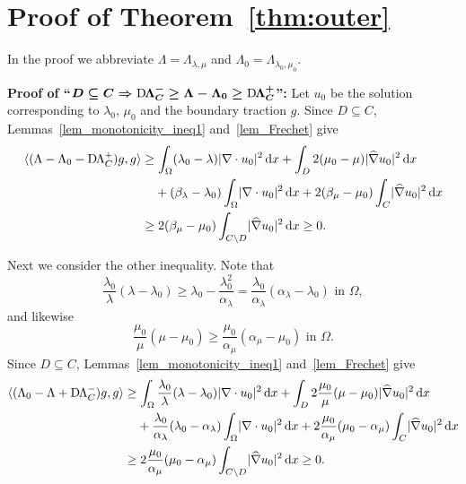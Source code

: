 \documentclass[reqno]{amsart}
\numberwithin{equation}{section}
\numberwithin{figure}{section}
\numberwithin{table}{section}
\newcommand{\abs}[1]{\lvert#1\rvert}
\newcommand{\inner}[1]{\langle#1\rangle}
\newcommand{\di}{\mathrm{d}}
\newcommand{\DLambda}{\textup{D}\mkern-1.5mu \Lambda}
\theoremstyle{definition}
\theoremstyle{plain}
\theoremstyle{definition}
\theoremstyle{remark}
\numberwithin{equation}{section}
\begin{document}
\section{Proof of Theorem~\ref{thm:outer}} \label{sec:proofthmouter}

In the proof we abbreviate $\Lambda = \Lambda_{\lambda,\mu}$ and $\Lambda_0 = \Lambda_{\lambda_0,\mu_0}$.

\textbf{Proof of ``$\boldsymbol{D\subseteq C \Rightarrow \DLambda_C^- \geq \Lambda - \Lambda_0 \geq \DLambda_C^+}$'':}	Let $u_0$ be the solution corresponding to $\lambda_0$, $\mu_0$ and the boundary traction $g$. Since $D\subseteq C$, Lemmas~\ref{lem_monotonicity_ineq1} and~\ref{lem_Frechet} give
%
\begin{align*}
	\inner{(\Lambda - \Lambda_0 - \DLambda_C^+)g,g} &\geq \int_\Omega (\lambda_0 - \lambda)\abs{\nabla\cdot u_0}^2\,\di x + \int_D 2(\mu_0-\mu)\abs{\widehat{\nabla}u_0}^2\,\di x \\
	&\hphantom{\geq{}} + (\beta_\lambda-\lambda_0)\int_\Omega\abs{\nabla\cdot u_0}^2\,\di x +2(\beta_\mu-\mu_0)\int_C \abs{\widehat{\nabla}u_0}^2\,\di x \\
	&\geq 2(\beta_\mu-\mu_0)\int_{C\setminus D} \abs{\widehat{\nabla}u_0}^2\,\di x \geq 0.
\end{align*}

Next we consider the other inequality. Note that
%
\begin{equation*}
	\frac{\lambda_0}{\lambda}(\lambda - \lambda_0) \geq \lambda_0-\frac{\lambda_0^2}{\alpha_\lambda} = \frac{\lambda_0}{\alpha_\lambda}(\alpha_\lambda-\lambda_0) \text{ in } \Omega,
\end{equation*}
%
and likewise
%
\begin{equation*}
	\frac{\mu_0}{\mu}(\mu - \mu_0) \geq \frac{\mu_0}{\alpha_\mu}(\alpha_\mu-\mu_0) \text{ in } \Omega.
\end{equation*}
%
Since $D\subseteq C$, Lemmas~\ref{lem_monotonicity_ineq1} and~\ref{lem_Frechet} give
%
\begin{align*}
	\inner{(\Lambda_0 - \Lambda + \DLambda_C^-)g,g} &\geq \int_{\Omega} \frac{\lambda_0}{\lambda}(\lambda - \lambda_0)\abs{\nabla\cdot u_0}^2\,\di x + \int_D 2\frac{\mu_0}{\mu}(\mu - \mu_0)\abs{\widehat{\nabla}u_0}^2\,\di x \\
	&\hphantom{\geq{}} + \frac{\lambda_0}{\alpha_\lambda}(\lambda_0-\alpha_\lambda)\int_\Omega \abs{\nabla\cdot u_0}^2\,\di x + 2\frac{\mu_0}{\alpha_\mu}(\mu_0-\alpha_\mu)\int_C\abs{\widehat{\nabla}u_0}^2\,\di x \\
	&\geq 2\frac{\mu_0}{\alpha_\mu}(\mu_0 - \alpha_\mu)\int_{C\setminus D} \abs{\widehat{\nabla}u_0}^2\,\di x \geq 0.
\end{align*}
\end{document}
